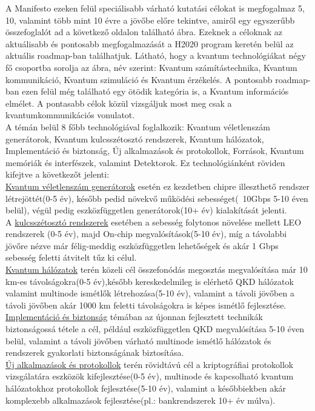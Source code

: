 A Manifesto  ezeken felül speciálisabb várható kutatási célokat is megfogalmaz 5, 10, valamint több mint 10 évre a jövőbe előre tekintve, amiről egy egyszerűbb összefoglalót ad a következő oldalon található ábra. Ezeknek a céloknak az aktuálisabb és pontosabb megfogalmazását a H2020 program keretén belül az aktuális roadmap-ban találhatjuk. Látható, hogy a kvantum technológiákat négy fő csoportba sorolja az ábra, név szerint: Kvantum számítástechnika, Kvantum kommunikáció, Kvantum szimuláció és Kvantum érzékelés. A pontosabb roadmap-ban ezen felül még található egy ötödik kategória is, a Kvantum információs elmélet. A pontasabb célok közül vizsgáljuk most meg csak a kvantumkommunikációs vonulatot.\\
A témán belül 8 főbb technológiával foglalkozik: Kvantum véletlenszám generátorok, Kvantum kulcsszétosztó rendszerek, Kvantum hálózatok, Implementáció és biztonság, Új alkalmazások és protokollok, Források, Kvantum memóriák és interfészek, valamint Detektorok.
Ez technológiánként röviden kifejtve a következőt jelenti: \\
\underline{Kvantum véletlenszám generátorok} esetén ez kezdetben chipre illeszthető rendszer létrejöttét(0-5 év), később pedid növekvő működési sebességet(~10Gbps 5-10 éven belül), végül pedig eszközfüggetlen generátorok(10+ év) kialakítását jelenti. \\
A \underline{kulcsszétosztó rendszerek} esetében a sebesség folytonos növelése mellett LEO rendszerek (0-5 év), majd On-chip megvalósítások(5-10 év), míg a távolabbi jövőre nézve már félig-meddig eszközfüggetlen lehetőségek és akár 1 Gbps sebesség feletti átvitelt tűz ki célul.\\
\underline{Kvantum hálózatok} terén közeli cél összefonódás megosztás megvalósítása már 10 km-es távolságokra(0-5 év),később kereskedelmileg is elérhető QKD hálózatok valamint multinode ismétlők létrehozása(5-10 év), valamint a távoli jövőben a távoli jövőben akár 1000 km feletti távolságokra is képes ismétlő fejlesztése.\\
\underline{Implementáció és biztonság} témában az újonnan fejlesztett technikák biztonságossá tétele a cél, például eszközfüggetlen QKD megvalósítása 5-10 éven belül, valamint a távoli jövőben várható multinode ismétlő hálózatok és rendszerek gyakorlati biztonságának biztosítása. \\
\underline{Új alkalmazások és protokollok} terén rövidtávú cél a kriptográfiai protokollok vizsgálatára eszközök kifejlesztése(0-5 év),  multinode és kapcsolható kvantum hálózatokhoz protokollok fejlesztése(5-10 év), valamint a későbbiekben akár komplexebb alkalmazások fejlesztése(pl.: bankrendszerek 10+ év múlva). \\
